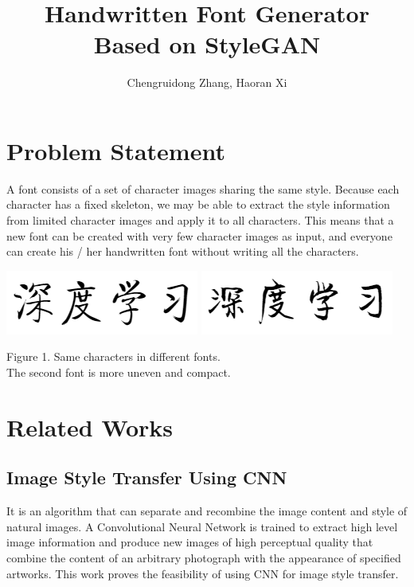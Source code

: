 \documentclass[letterpaper]{article}
\begin{document}
%
\title{Handwritten Font Generator \\ Based on StyleGAN}
\author{Chengruidong Zhang, Haoran Xi}
\maketitle

\section{Problem Statement}
A font consists of a set of character images sharing the same style. Because each character has a fixed skeleton, we may be able to extract the style information from limited character images and apply it to all characters. This means that a new font can be created with very few character images as input, and everyone can create his / her handwritten font without writing all the characters.

\begin{center}
    \includegraphics[]{proposal-fig-qiti.png}
    \includegraphics[]{proposal-fig-jinglei.png}

    Figure 1. Same characters in different fonts.\\The second font is more uneven and compact.
\end{center}


\section{Related Works}
\subsection{Image Style Transfer Using CNN}
It is an algorithm that can separate and recombine the image content and style of natural images. A Convolutional Neural Network is trained to extract high level image information and produce new images of high perceptual quality that combine the content of an arbitrary photograph with the appearance of specified artworks. This work proves the feasibility of using CNN for image style transfer.
\end{document}
